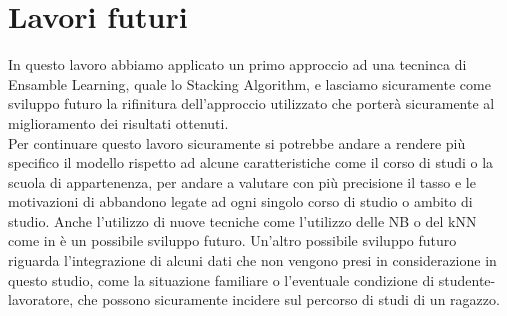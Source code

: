 \documentclass[../../Report.tex]{subfiles}
\begin{document}
\section{Lavori futuri}
In questo lavoro abbiamo applicato un primo approccio ad una tecninca di Ensamble Learning, quale lo Stacking Algorithm, e lasciamo sicuramente come sviluppo futuro la rifinitura dell'approccio utilizzato che porterà sicuramente al miglioramento dei risultati ottenuti.\\
Per continuare questo lavoro sicuramente si potrebbe andare a rendere più specifico il modello rispetto ad alcune caratteristiche come il corso di studi o la scuola di appartenenza, per andare a valutare con più precisione il tasso e le motivazioni di abbandono legate ad ogni singolo corso di studio o ambito di studio. Anche l'utilizzo di nuove tecniche come l'utilizzo delle NB o del kNN come in \cite{agrusti2020deep} è un possibile sviluppo futuro. Un'altro possibile sviluppo futuro riguarda l'integrazione di alcuni dati che non vengono presi in considerazione in questo studio, come la situazione familiare o l'eventuale condizione di studente-lavoratore, che possono sicuramente incidere sul percorso di studi di un ragazzo.
\end{document}
